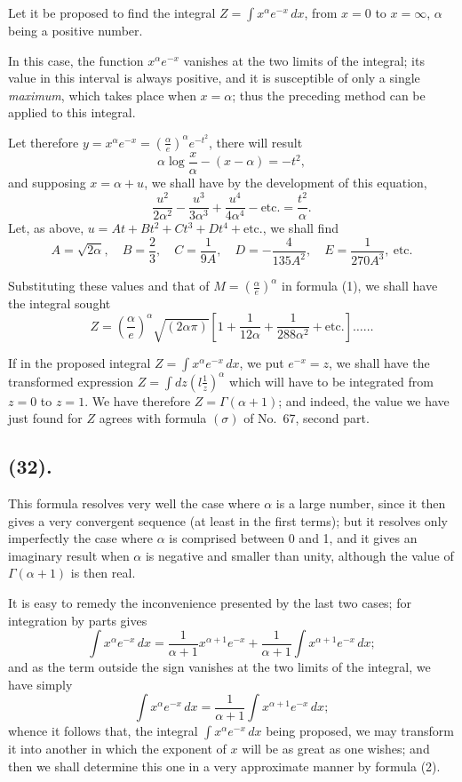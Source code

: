 \documentclass{article}
\begin{document}
Let it be proposed to find the integral $Z=\displaystyle\int x^{\alpha}e^{-x}\,dx$, from $x=0$ to $x=\infty$, $\alpha$ being a positive number.

In this case, the function $x^{\alpha}e^{-x}$ vanishes at the two limits of the integral; its value in this interval is always positive, and it is susceptible of only a single \emph{maximum}, which takes place when $x=\alpha$; thus the preceding method can be applied to this integral.

Let therefore $y=x^{\alpha}e^{-x}=\left(\frac{\alpha}{e}\right)^{\alpha}e^{-t^{2}}$, there will result
\[ \alpha\log\frac{x}{\alpha}-(x-\alpha)=-t^{2}, \]
and supposing $x=\alpha+u$, we shall have by the development of this equation,
\[ \frac{u^{2}}{2\alpha^{2}}-\frac{u^{3}}{3\alpha^{3}}+\frac{u^{4}}{4\alpha^{4}}-\text{etc.}=\frac{t^{2}}{\alpha}. \]
Let, as above, $u=At+Bt^{2}+Ct^{3}+Dt^{4}+\text{etc.}$, we shall find
\[ A=\sqrt{2\alpha},\quad B=\frac{2}{3},\quad C=\frac{1}{9A},\quad D=-\frac{4}{135A^{2}},\quad E=\frac{1}{270A^{3}},\ \text{etc.} \]

Substituting these values and that of $M=\left(\frac{\alpha}{e}\right)^{\alpha}$ in formula (1), we shall have the integral sought
\[ Z=\left(\frac{\alpha}{e}\right)^{\alpha}\sqrt{(2\alpha\pi)}\left[1+\frac{1}{12\alpha}+\frac{1}{288\alpha^{2}}+\text{etc.}\right]\ldots\ldots \tag{2} \]

If in the proposed integral $Z=\displaystyle\int x^{\alpha}e^{-x}\,dx$, we put $e^{-x}=z$, we shall have the transformed expression $Z=\displaystyle\int dz\left(l\frac{1}{z}\right)^{\alpha}$ which will have to be integrated from $z=0$ to $z=1$. We have therefore $Z=\Gamma(\alpha+1)$; and indeed, the value we have just found for $Z$ agrees with formula $(\sigma)$ of No.~67, second part.

\subsection*{(32).}

This formula resolves very well the case where $\alpha$ is a large number, since it then gives a very convergent sequence (at least in the first terms); but it resolves only imperfectly the case where $\alpha$ is comprised between 0 and 1, and it gives an imaginary result when $\alpha$ is negative and smaller than unity, although the value of $\Gamma(\alpha+1)$ is then real.

It is easy to remedy the inconvenience presented by the last two cases; for integration by parts gives
\[ \int x^{\alpha}e^{-x}\,dx=\frac{1}{\alpha+1}x^{\alpha+1}e^{-x}+\frac{1}{\alpha+1}\int x^{\alpha+1}e^{-x}\,dx; \]
and as the term outside the sign vanishes at the two limits of the integral, we have simply
\[ \int x^{\alpha}e^{-x}\,dx=\frac{1}{\alpha+1}\int x^{\alpha+1}e^{-x}\,dx; \]
whence it follows that, the integral $\displaystyle\int x^{\alpha}e^{-x}\,dx$ being proposed, we may transform it into another in which the exponent of $x$ will be as great as one wishes; and then we shall determine this one in a very approximate manner by formula (2).
\end{document}
